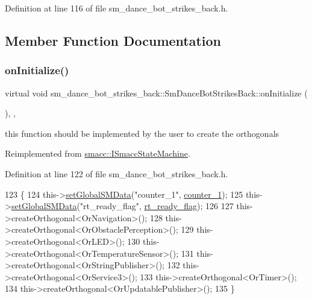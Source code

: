 Definition at line 116 of file sm\+\_\+dance\+\_\+bot\+\_\+strikes\+\_\+back.\+h.



\subsection{Member Function Documentation}
\mbox{\label{structsm__dance__bot__strikes__back_1_1SmDanceBotStrikesBack_ad6a9ef45cc05cb6fed4550f2f04d4a3e}} 
\subsubsection{\texorpdfstring{on\+Initialize()}{onInitialize()}}
{\footnotesize\ttfamily virtual void sm\+\_\+dance\+\_\+bot\+\_\+strikes\+\_\+back\+::\+Sm\+Dance\+Bot\+Strikes\+Back\+::on\+Initialize (\begin{DoxyParamCaption}{ }\end{DoxyParamCaption})\hspace{0.3cm}{\ttfamily [inline]}, {\ttfamily [override]}, {\ttfamily [virtual]}}



this function should be implemented by the user to create the orthogonals 



Reimplemented from \hyperlink{classsmacc_1_1ISmaccStateMachine_ac2982c6c8283663e5e1e8a7c82f511ec}{smacc\+::\+I\+Smacc\+State\+Machine}.



Definition at line 122 of file sm\+\_\+dance\+\_\+bot\+\_\+strikes\+\_\+back.\+h.


\begin{DoxyCode}
123     \{
124         this->\hyperlink{classsmacc_1_1ISmaccStateMachine_a8588f9e580fbb95b53e2bd2ca3ff1f98}{setGlobalSMData}(\textcolor{stringliteral}{"counter\_1"}, \hyperlink{structsm__dance__bot__strikes__back_1_1SmDanceBotStrikesBack_a0cf56e316022dde4b3da552ab9f68513}{counter\_1});
125         this->\hyperlink{classsmacc_1_1ISmaccStateMachine_a8588f9e580fbb95b53e2bd2ca3ff1f98}{setGlobalSMData}(\textcolor{stringliteral}{"rt\_ready\_flag"}, \hyperlink{structsm__dance__bot__strikes__back_1_1SmDanceBotStrikesBack_a609265a94c2575580fbb014f551a066a}{rt\_ready\_flag});
126 
127         this->createOrthogonal<OrNavigation>();
128         this->createOrthogonal<OrObstaclePerception>();
129         this->createOrthogonal<OrLED>();
130         this->createOrthogonal<OrTemperatureSensor>();
131         this->createOrthogonal<OrStringPublisher>();
132         this->createOrthogonal<OrService3>();
133         this->createOrthogonal<OrTimer>();
134         this->createOrthogonal<OrUpdatablePublisher>();
135     \}
\end{DoxyCode}


